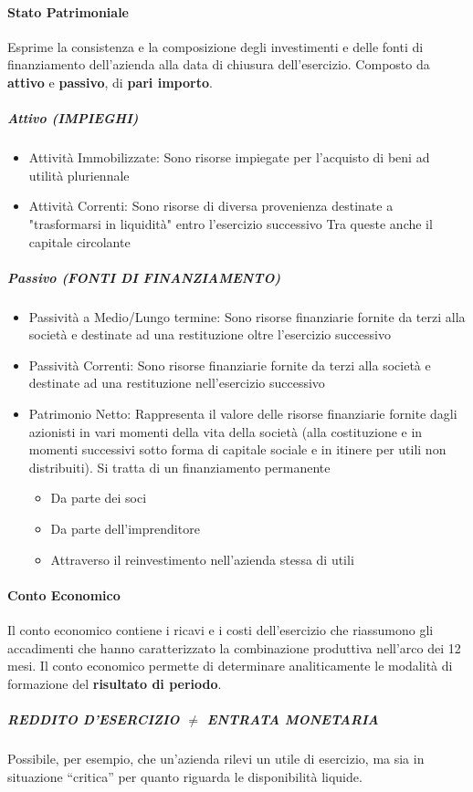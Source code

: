 \documentclass[12pt]{article}
\begin{document}
\paragraph{Stato Patrimoniale} Esprime la consistenza e la composizione degli investimenti e delle fonti di finanziamento dell'azienda alla data di chiusura dell'esercizio. Composto da \textbf{attivo} e \textbf{passivo}, di \textbf{pari importo}.
\subparagraph{Attivo (IMPIEGHI)}
\begin{itemize}
    \item Attività Immobilizzate: Sono risorse impiegate per l'acquisto di beni ad utilità pluriennale
    \item Attività Correnti: Sono risorse di diversa provenienza destinate a "trasformarsi in liquidità" entro l'esercizio successivo  Tra queste anche il capitale circolante
\end{itemize}
\subparagraph{Passivo (FONTI DI FINANZIAMENTO)}
\begin{itemize}
    \item Passività a Medio/Lungo termine: Sono risorse finanziarie fornite da terzi alla società e destinate ad una restituzione oltre l'esercizio successivo
    \item Passività Correnti: Sono risorse finanziarie fornite da terzi alla società e destinate ad una restituzione nell'esercizio successivo
    \item Patrimonio Netto: Rappresenta il valore delle risorse finanziarie fornite dagli azionisti in vari momenti della vita della società (alla costituzione e in momenti successivi sotto forma di capitale sociale e in itinere per utili non distribuiti). Si tratta di un finanziamento permanente
          \begin{itemize}
              \item Da parte dei soci
              \item Da parte dell'imprenditore
              \item Attraverso il reinvestimento nell'azienda stessa di utili
          \end{itemize}
\end{itemize}
\paragraph{Conto Economico} Il conto economico contiene i ricavi e i costi dell'esercizio che riassumono gli accadimenti che hanno caratterizzato la combinazione produttiva nell'arco dei 12 mesi. Il conto economico permette di determinare analiticamente le modalità di formazione del \textbf{risultato di periodo}.
\subparagraph{REDDITO D'ESERCIZIO $\neq$ ENTRATA MONETARIA}
Possibile, per esempio, che un’azienda rilevi un utile di esercizio, ma sia in situazione “critica” per quanto riguarda le disponibilità liquide.
\end{document}
